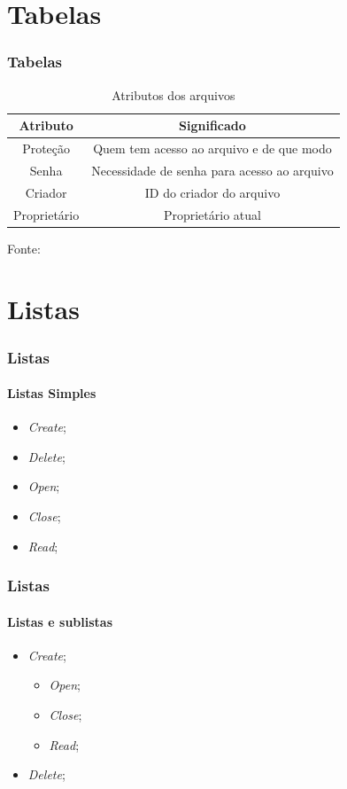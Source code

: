 \documentclass[aspectratio=169]{beamer}
\begin{document}
	\section{Tabelas}	
	\begin{frame}
		\frametitle{Tabelas}
				
		\begin{table}[H]
			\centering
			\caption{Atributos dos arquivos}
			\begin{tabular}{c|c}
				\toprule
				\textbf{Atributo} & \textbf{Significado} \\
				\midrule
				Prote\c{c}\~{a}o&Quem tem acesso ao arquivo e de que modo\\
				\midrule
				Senha&Necessidade de senha para acesso ao arquivo\\
				\midrule
				Criador&ID do criador do arquivo\\
				\midrule
				Propriet\'{a}rio&Propriet\'{a}rio atual\\
				\bottomrule
			\end{tabular}
			
			\label{tab:attI}
			\footnotesize{Fonte: }				
		\end{table}
	\end{frame}
	
	\section{Listas}
	\begin{frame}
		\frametitle{Listas}
		\framesubtitle{Listas Simples}
		\begin{itemize}
			\item \textit{Create};
			\item \textit{Delete};
			\item \textit{Open};
			\item \textit{Close};
			\item \textit{Read};
		\end{itemize}
	\end{frame}
	
	\begin{frame}
		\frametitle{Listas}
		\framesubtitle{Listas e sublistas}
		\begin{itemize}
			\item \textit{Create};
			\begin{itemize}
				\item \textit{Open};
				\item \textit{Close};
				\item \textit{Read};
			\end{itemize}
			\item \textit{Delete};
			
		\end{itemize}
	\end{frame}
	
\end{document}
